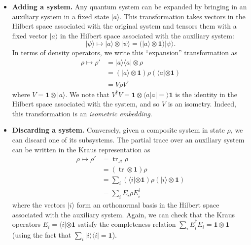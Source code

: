 \documentclass[fleqn]{article}
\begin{document}
\begin{itemize}
\item
  \textbf{Adding a system.}
  Any quantum system can be expanded by bringing in an auxiliary system in a fixed state \(|a\rangle\).
  This transformation takes vectors in the Hilbert space associated with the original system and tensors them with a fixed vector \(|a\rangle\) in the Hilbert space associated with the auxiliary system:
  \[
      |\psi\rangle
      \longmapsto |a\rangle\otimes|\psi\rangle
      = (|a\rangle\otimes\mathbf{1}) |\psi\rangle.
    \]
  In terms of density operators, we write this ``expansion'' transformation as
  \[
      \begin{aligned}
        \rho
        \longmapsto \rho'
        &= |a\rangle\langle a|\otimes\rho
      \\&= (|a\rangle\otimes\mathbf{1})\rho (\langle a|\otimes\mathbf{1})
      \\&= V\rho V^\dagger
      \end{aligned}
    \]
  where \(V=\mathbf{1}\otimes|a\rangle\).
  We note that \(V^\dagger V = \mathbf{1}\otimes\langle a|a|=\rangle\mathbf{1}\) is the identity in the Hilbert space associated with the system, and so \(V\) is an isometry.
  Indeed, this transformation is an \emph{isometric embedding}.
\item
  \textbf{Discarding a system.}
  Conversely, given a composite system in state \(\rho\), we can discard one of its subsystems.
  The partial trace over an auxiliary system can be written in the Kraus representation as
  \[
      \begin{aligned}
        \rho
        \longmapsto \rho'
        &= \operatorname{tr}_\mathcal{A}\rho
      \\&= (\operatorname{tr}\otimes\mathbf{1})\rho
      \\&= \sum_i (\langle i|\otimes\mathbf{1})\rho(|i\rangle\otimes\mathbf{1})
      \\&= \sum_i E_i\rho E^\dagger_i
      \end{aligned}
    \]
  where the vectors \(|i\rangle\) form an orthonormal basis in the Hilbert space associated with the auxiliary system.
  Again, we can check that the Kraus operators \(E_i=\langle i|\otimes\mathbf{1}\) satisfy the completeness relation \(\sum_i E^\dagger_i E_i =\mathbf{1}\otimes\mathbf{1}\) (using the fact that \(\sum_i|i\rangle\langle i|=\mathbf{1}\)).
\end{itemize}
\end{document}
